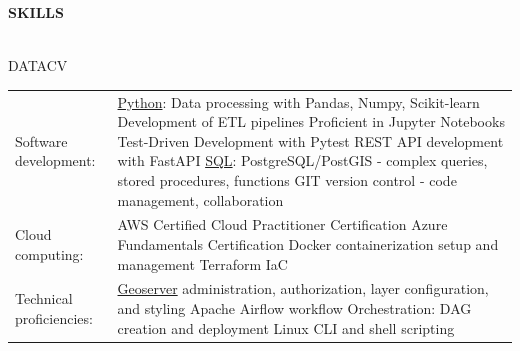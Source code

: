 \documentclass[letterpaper]{article}
\newcommand{\lineunder} {
        \vspace*{-8pt} \\
        \hspace*{-18pt} \hrulefill \\
    }
\newcommand{\header} [1] {
        \vspace{9pt}
        {\hspace*{-18pt}\vspace*{6pt} \large \textbf {#1}}
        \vspace*{-6pt} \lineunder
        \vspace{2pt}
    }
\newenvironment{skillslist}
        {
            \hspace*{-0.07in}\begin{tabular}[t]{ l L{5.17in} }
        }{
            \end{tabular}
        }
\newcommand{\impt}[1]{\uline{#1}}
\begin{document}
\header{SKILLS}
    \begin{taggedblock}{DATACV}
        \begin{skillslist}
            Software development:&
                \impt{Python}: Data processing with Pandas, Numpy, Scikit-learn \linebreak
                Development of ETL pipelines \linebreak
                Proficient in Jupyter Notebooks \linebreak
                Test-Driven Development with Pytest \linebreak
                REST API development with FastAPI \linebreak
                \impt{SQL}: PostgreSQL/PostGIS - complex queries, stored procedures, functions \linebreak
                GIT version control - code management, collaboration \linebreak
                \\
            Cloud computing:&
                AWS Certified Cloud Practitioner Certification \linebreak
                Azure Fundamentals Certification \linebreak
                Docker containerization setup and management \linebreak
                Terraform IaC \linebreak
                \\
            Technical proficiencies:&
                \impt{Geoserver} administration, authorization, layer configuration, and styling \linebreak
                Apache Airflow workflow Orchestration: DAG creation and deployment \linebreak
                Linux CLI and shell scripting \linebreak
                \\
        \end{skillslist}
    \end{taggedblock}
\end{document}
